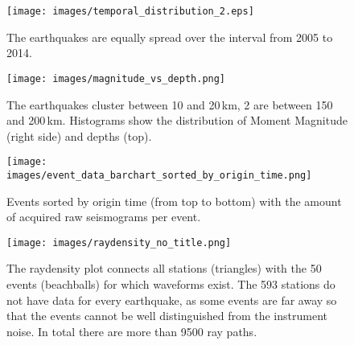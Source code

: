 
\begin{figure}[h]
\begin{center}
\texttt{[image: images/temporal\_distribution\_2.eps]}
\caption[Temporal distribution of the earthquakes.]{The earthquakes are equally spread over 
the interval from 2005 to 2014.}
\label{temp_dist}
\end{center}
\end{figure}

\begin{figure}[h]
\begin{center}
\texttt{[image: images/magnitude\_vs\_depth.png]}
\caption[Depth distribution of the earthquakes.]{The earthquakes cluster between 10 and 20\,km, 
2 are between 150 and 200\,km. 
Histograms show the distribution of Moment Magnitude (right side) and depths (top).}
\label{depth_scatter}
\end{center}
\end{figure}

\begin{figure}[h]
\begin{center}
\texttt{[image: images/event\_data\_barchart\_sorted\_by\_origin\_time.png]}
\caption[Raw seismograms per event]{Events sorted by origin time (from top to bottom) with the amount 
of acquired raw seismograms per event.}
\label{event_data}
\end{center}
\end{figure}


\begin{figure}[H]
\begin{center}
\texttt{[image: images/raydensity\_no\_title.png]}
\caption[The raydensity plot for the 50 events.]{The raydensity plot connects all stations (triangles) with the 50 
events (beachballs) for which waveforms exist. 
The 593 stations do not have data for every earthquake, as some events are far away so that the events cannot be well
distinguished from the instrument noise. In total there are more than 9500 ray paths.}
\label{raydens}
\end{center}
\end{figure}

